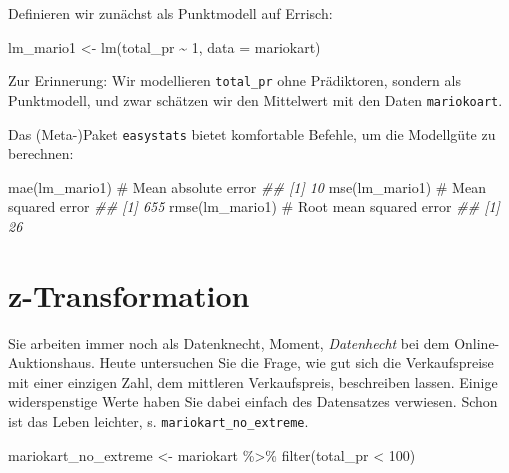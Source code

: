 \documentclass[
  a4paper,
]{scrbook}
\newenvironment{Shaded}{\begin{snugshade}}{\end{snugshade}}
\newcommand{\AttributeTok}[1]{\textcolor[rgb]{0.40,0.45,0.13}{#1}}
\newcommand{\CommentTok}[1]{\textcolor[rgb]{0.37,0.37,0.37}{#1}}
\newcommand{\DecValTok}[1]{\textcolor[rgb]{0.68,0.00,0.00}{#1}}
\newcommand{\DocumentationTok}[1]{\textcolor[rgb]{0.37,0.37,0.37}{\textit{#1}}}
\newcommand{\FunctionTok}[1]{\textcolor[rgb]{0.28,0.35,0.67}{#1}}
\newcommand{\NormalTok}[1]{\textcolor[rgb]{0.00,0.23,0.31}{#1}}
\newcommand{\OtherTok}[1]{\textcolor[rgb]{0.00,0.23,0.31}{#1}}
\newcommand{\SpecialCharTok}[1]{\textcolor[rgb]{0.37,0.37,0.37}{#1}}
\theoremstyle{definition}
\theoremstyle{definition}
\theoremstyle{definition}
\theoremstyle{remark}
\begin{document}
Definieren wir zunächst als Punktmodell auf Errisch:

\begin{Shaded}
\begin{Highlighting}[]
\NormalTok{lm\_mario1 }\OtherTok{\textless{}{-}} \FunctionTok{lm}\NormalTok{(total\_pr }\SpecialCharTok{\textasciitilde{}} \DecValTok{1}\NormalTok{, }\AttributeTok{data =}\NormalTok{ mariokart)}
\end{Highlighting}
\end{Shaded}

Zur Erinnerung: Wir modellieren \texttt{total\_pr} ohne Prädiktoren,
sondern als Punktmodell, und zwar schätzen wir den Mittelwert mit den
Daten \texttt{mariokoart}.

Das (Meta-)Paket \texttt{easystats} bietet komfortable Befehle, um die
Modellgüte zu berechnen:

\begin{Shaded}
\begin{Highlighting}[]
\FunctionTok{mae}\NormalTok{(lm\_mario1)  }\CommentTok{\# Mean absolute error}
\DocumentationTok{\#\# [1] 10}
\FunctionTok{mse}\NormalTok{(lm\_mario1)  }\CommentTok{\# Mean squared error}
\DocumentationTok{\#\# [1] 655}
\FunctionTok{rmse}\NormalTok{(lm\_mario1)  }\CommentTok{\# Root mean squared error}
\DocumentationTok{\#\# [1] 26}
\end{Highlighting}
\end{Shaded}

\section{z-Transformation}\label{z-transformation}

Sie arbeiten immer noch als Datenknecht, Moment, \emph{Datenhecht} bei
dem Online-Auktionshaus. Heute untersuchen Sie die Frage, wie gut sich
die Verkaufspreise mit einer einzigen Zahl, dem mittleren Verkaufspreis,
beschreiben lassen. Einige widerspenstige Werte haben Sie dabei einfach
des Datensatzes verwiesen. Schon ist das Leben leichter, s.
\texttt{mariokart\_no\_extreme}.

\begin{Shaded}
\begin{Highlighting}[]
\NormalTok{mariokart\_no\_extreme }\OtherTok{\textless{}{-}} 
\NormalTok{  mariokart }\SpecialCharTok{\%\textgreater{}\%} 
  \FunctionTok{filter}\NormalTok{(total\_pr }\SpecialCharTok{\textless{}} \DecValTok{100}\NormalTok{)}
\end{Highlighting}
\end{Shaded}
\end{document}
